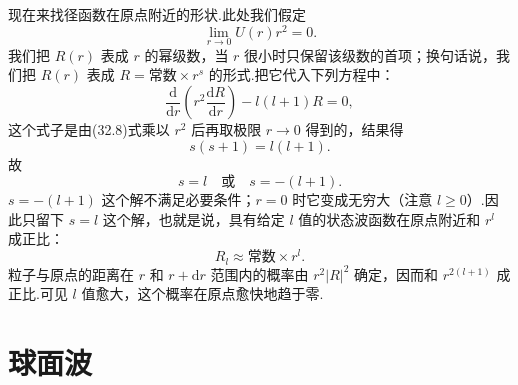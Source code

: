 现在来找径函数在原点附近的形状.此处我们假定
\begin{equation}
  \lim_{r\to0}U(r)r^2=0.
\end{equation}
我们把 $R(r)$ 表成 $r$ 的幂级数，当 $r$ 很小时只保留该级数的首项；换句话说，我们把 $R(r)$ 表成 $R=\text{常数}\times r^s$ 的形式.把它代入下列方程中：
\begin{equation*}
  \frac{\mathrm{d}}{\mathrm{d}r}\left(r^2\frac{\mathrm{d}R}{\mathrm{d}r}\right)-l(l+1)R=0,
\end{equation*}
这个式子是由(32.8)式乘以 $r^2$ 后再取极限 $r\to0$ 得到的，结果得
\begin{equation*}
  s(s+1)=l(l+1).
\end{equation*}
故
\begin{equation*}
  s=l\quad\text{或}\quad s=-(l+1).
\end{equation*}
$s=-(l+1)$ 这个解不满足必要条件；$r=0$ 时它变成无穷大（注意 $l\geqslant0$）.因此只留下 $s=l$ 这个解，也就是说，具有给定 $l$ 值的状态波函数在原点附近和 $r^l$ 成正比：
\begin{equation}
  R_l\approx\text{常数}\times r^l.
\end{equation}
粒子与原点的距离在 $r$ 和 $r+\mathrm{d}r$ 范围内的概率由 $r^2|R|^2$ 确定，因而和 $r^{2(l+1)}$ 成正比.可见 $l$ 值愈大，这个概率在原点愈快地趋于零.

\section{球面波}

